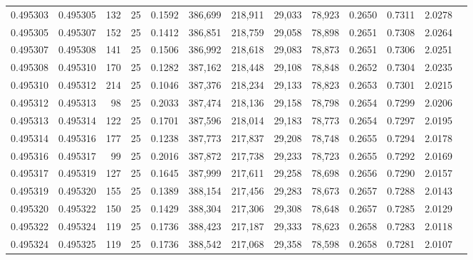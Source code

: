 \begin{tabular}{rrrrrrrrrrrrr}
0.495303 & 0.495305 &   132 &  25 &                                     0.1592 & 386,699 & 218,911 &  29,033 &  78,923 & 0.2650 & 0.7311 & 2.0278 \\
0.495305 & 0.495307 &   152 &  25 &                                     0.1412 & 386,851 & 218,759 &  29,058 &  78,898 & 0.2651 & 0.7308 & 2.0264 \\
0.495307 & 0.495308 &   141 &  25 &                                     0.1506 & 386,992 & 218,618 &  29,083 &  78,873 & 0.2651 & 0.7306 & 2.0251 \\
0.495308 & 0.495310 &   170 &  25 &                                     0.1282 & 387,162 & 218,448 &  29,108 &  78,848 & 0.2652 & 0.7304 & 2.0235 \\
0.495310 & 0.495312 &   214 &  25 &                                     0.1046 & 387,376 & 218,234 &  29,133 &  78,823 & 0.2653 & 0.7301 & 2.0215 \\
0.495312 & 0.495313 &    98 &  25 &                                     0.2033 & 387,474 & 218,136 &  29,158 &  78,798 & 0.2654 & 0.7299 & 2.0206 \\
0.495313 & 0.495314 &   122 &  25 &                                     0.1701 & 387,596 & 218,014 &  29,183 &  78,773 & 0.2654 & 0.7297 & 2.0195 \\
0.495314 & 0.495316 &   177 &  25 &                                     0.1238 & 387,773 & 217,837 &  29,208 &  78,748 & 0.2655 & 0.7294 & 2.0178 \\
0.495316 & 0.495317 &    99 &  25 &                                     0.2016 & 387,872 & 217,738 &  29,233 &  78,723 & 0.2655 & 0.7292 & 2.0169 \\
0.495317 & 0.495319 &   127 &  25 &                                     0.1645 & 387,999 & 217,611 &  29,258 &  78,698 & 0.2656 & 0.7290 & 2.0157 \\
0.495319 & 0.495320 &   155 &  25 &                                     0.1389 & 388,154 & 217,456 &  29,283 &  78,673 & 0.2657 & 0.7288 & 2.0143 \\
0.495320 & 0.495322 &   150 &  25 &                                     0.1429 & 388,304 & 217,306 &  29,308 &  78,648 & 0.2657 & 0.7285 & 2.0129 \\
0.495322 & 0.495324 &   119 &  25 &                                     0.1736 & 388,423 & 217,187 &  29,333 &  78,623 & 0.2658 & 0.7283 & 2.0118 \\
0.495324 & 0.495325 &   119 &  25 &                                     0.1736 & 388,542 & 217,068 &  29,358 &  78,598 & 0.2658 & 0.7281 & 2.0107 \\

\end{tabular}
